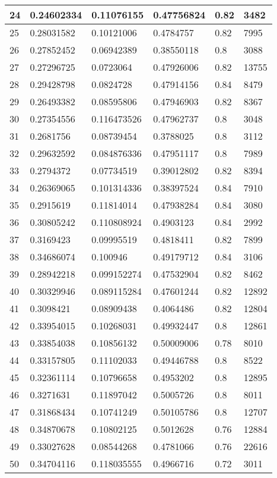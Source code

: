 \begin{longtable}{|l|l|l|l|l|l|}
24 & 0.24602334 & 0.11076155 & 0.47756824 & 0.82 & 3482 \\ \hline 
25 & 0.28031582 & 0.10121006 & 0.4784757 & 0.82 & 7995 \\ \hline 
26 & 0.27852452 & 0.06942389 & 0.38550118 & 0.8 & 3088 \\ \hline 
27 & 0.27296725 & 0.0723064 & 0.47926006 & 0.82 & 13755 \\ \hline 
28 & 0.29428798 & 0.0824728 & 0.47914156 & 0.84 & 8479 \\ \hline 
29 & 0.26493382 & 0.08595806 & 0.47946903 & 0.82 & 8367 \\ \hline 
30 & 0.27354556 & 0.116473526 & 0.47962737 & 0.8 & 3048 \\ \hline 
31 & 0.2681756 & 0.08739454 & 0.3788025 & 0.8 & 3112 \\ \hline 
32 & 0.29632592 & 0.084876336 & 0.47951117 & 0.8 & 7989 \\ \hline 
33 & 0.2794372 & 0.07734519 & 0.39012802 & 0.82 & 8394 \\ \hline 
34 & 0.26369065 & 0.101314336 & 0.38397524 & 0.84 & 7910 \\ \hline 
35 & 0.2915619 & 0.11814014 & 0.47938284 & 0.84 & 3080 \\ \hline 
36 & 0.30805242 & 0.110808924 & 0.4903123 & 0.84 & 2992 \\ \hline 
37 & 0.3169423 & 0.09995519 & 0.4818411 & 0.82 & 7899 \\ \hline 
38 & 0.34686074 & 0.100946 & 0.49179712 & 0.84 & 3106 \\ \hline 
39 & 0.28942218 & 0.099152274 & 0.47532904 & 0.82 & 8462 \\ \hline 
40 & 0.30329946 & 0.089115284 & 0.47601244 & 0.82 & 12892 \\ \hline 
41 & 0.3098421 & 0.08909438 & 0.4064486 & 0.82 & 12804 \\ \hline 
42 & 0.33954015 & 0.10268031 & 0.49932447 & 0.8 & 12861 \\ \hline 
43 & 0.33854038 & 0.10856132 & 0.50009006 & 0.78 & 8010 \\ \hline 
44 & 0.33157805 & 0.11102033 & 0.49446788 & 0.8 & 8522 \\ \hline 
45 & 0.32361114 & 0.10796658 & 0.4953202 & 0.8 & 12895 \\ \hline 
46 & 0.3271631 & 0.11897042 & 0.5005726 & 0.8 & 8011 \\ \hline 
47 & 0.31868434 & 0.10741249 & 0.50105786 & 0.8 & 12707 \\ \hline 
48 & 0.34870678 & 0.10802125 & 0.5012628 & 0.76 & 12884 \\ \hline 
49 & 0.33027628 & 0.08544268 & 0.4781066 & 0.76 & 22616 \\ \hline 
50 & 0.34704116 & 0.118035555 & 0.4966716 & 0.72 & 3011 \\ \hline 
\end{longtable}